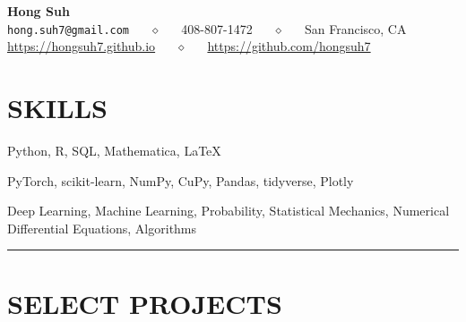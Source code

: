 \documentclass{simplecv}
\begin{document}
\thispagestyle{empty}

\begin{center}
  {\Large\bf Hong Suh} \\
  \texttt{hong.suh7@gmail.com} ~~ $\diamond$ ~~ 408-807-1472 ~~ $\diamond$ ~~ San Francisco, CA \\
  \url{https://hongsuh7.github.io} ~~ $\diamond$ ~~ \url{https://github.com/hongsuh7} \\
\end{center}


\section{SKILLS}
 Python, R, SQL, Mathematica, \LaTeX

 PyTorch, scikit-learn, NumPy, CuPy, Pandas, tidyverse, Plotly

 Deep Learning, Machine Learning, Probability, Statistical Mechanics, Numerical Differential Equations, Algorithms

\rule{10cm}{0.5pt}

\vspace{-0.4cm}

\section{SELECT PROJECTS}
\end{document}
